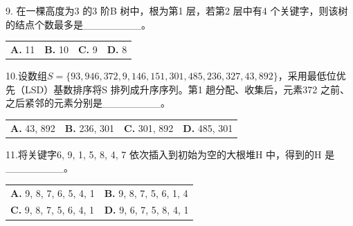 \documentclass[UTF8,11pt]{ctexart}
\begin{document}
9. 在一棵高度为3 的3 阶B 树中，根为第1 层，若第2 层中有4 个关键字，则该树的结点个数最多是\_\_\_\_\_\_\_\_。


\begin{center}\begin{tabular}{>{\raggedright\arraybackslash}p{\dimexpr(\linewidth-8\tabcolsep)/4\relax}>{\raggedright\arraybackslash}p{\dimexpr(\linewidth-8\tabcolsep)/4\relax}>{\raggedright\arraybackslash}p{\dimexpr(\linewidth-8\tabcolsep)/4\relax}>{\raggedright\arraybackslash}p{\dimexpr(\linewidth-8\tabcolsep)/4\relax}}
\textbf{A.} 11 & \textbf{B.} 10 & \textbf{C.} 9 & \textbf{D.} 8\\[.35em]\end{tabular}\end{center}

10.设数组\(\displaystyle S=\{93,\allowbreak 946,\allowbreak 372,\allowbreak 9,\allowbreak 146,\allowbreak 151,\allowbreak 301,\allowbreak 485,\allowbreak 236,\allowbreak 327,\allowbreak 43,\allowbreak 892\}\)，采用最低位优先（LSD）基数排序将S 排列成升序序列。第1 趟分配、收集后，元素372 之前、之后紧邻的元素分别是\_\_\_\_\_\_\_\_。


\begin{center}\begin{tabular}{>{\raggedright\arraybackslash}p{\dimexpr(\linewidth-8\tabcolsep)/4\relax}>{\raggedright\arraybackslash}p{\dimexpr(\linewidth-8\tabcolsep)/4\relax}>{\raggedright\arraybackslash}p{\dimexpr(\linewidth-8\tabcolsep)/4\relax}>{\raggedright\arraybackslash}p{\dimexpr(\linewidth-8\tabcolsep)/4\relax}}
\textbf{A.} 43, 892 & \textbf{B.} 236, 301 & \textbf{C.} 301, 892 & \textbf{D.} 485, 301\\[.35em]\end{tabular}\end{center}

11.将关键字6, 9, 1, 5, 8, 4, 7 依次插入到初始为空的大根堆H 中，得到的H 是\_\_\_\_\_\_\_\_。


\begin{center}\begin{tabular}{>{\raggedright\arraybackslash}p{\dimexpr(\linewidth-4\tabcolsep)/2\relax}>{\raggedright\arraybackslash}p{\dimexpr(\linewidth-4\tabcolsep)/2\relax}}
\textbf{A.} 9, 8, 7, 6, 5, 4, 1 & \textbf{B.} 9, 8, 7, 5, 6, 1, 4\\[.35em]
\textbf{C.} 9, 8, 7, 5, 6, 4, 1 & \textbf{D.} 9, 6, 7, 5, 8, 4, 1\\[.35em]\end{tabular}\end{center}
\end{document}

